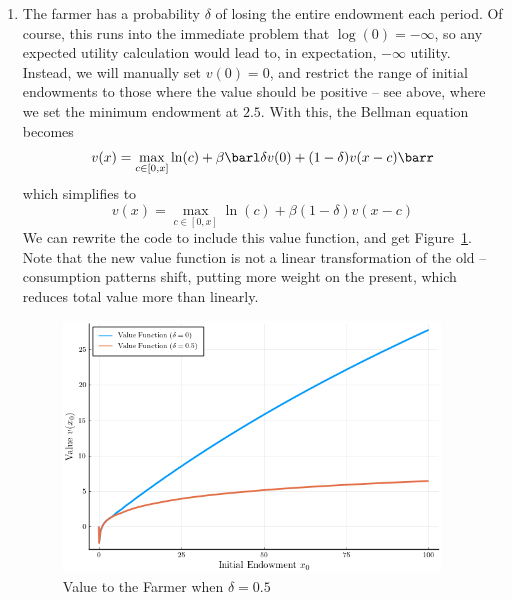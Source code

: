 \documentclass[10pt]{article}
\begin{document}
\begin{enumerate}
	\item The farmer has a probability $\delta$ of losing the entire endowment each period. Of course, this runs into the immediate problem that $\log(0) = -\infty$, so any expected utility calculation would lead to, in expectation, $-\infty$ utility. Instead, we will manually set $v(0)=0$, and restrict the range of initial endowments to those where the value should be positive -- see above, where we set the minimum endowment at $2.5$. With this, the Bellman equation becomes \[v(x) = \max_{c \in [0,x]} \ln(c) + \beta \barl \delta v(0) + (1-\delta)v(x-c)\barr \]which simplifies to \[v(x) = \max_{c \in [0,x]} \ln(c) + \beta(1-\delta)v(x-c)\]We can rewrite the code to include this value function, and get Figure~\ref{fig:value_delta}. Note that the new value function is not a linear transformation of the old -- consumption patterns shift, putting more weight on the present, which reduces total value more than linearly. \begin{figure}[H] \centering \includegraphics[width=10cm]{macro_hw3_code/value_function_delta.png} \caption{Value to the Farmer when $\delta = 0.5$} \label{fig:value_delta} \end{figure}

\end{enumerate}
\end{document}
